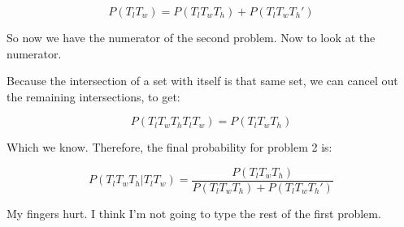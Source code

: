 \documentclass{article}
\begin{document}
\[
P(T_lT_w)=P(T_lT_wT_h)+P(T_lT_wT_h')
\]

So now we have the numerator of the second problem. Now to look at the
numerator.

Because the intersection of a set with itself is that same set, we can
cancel out the remaining intersections, to get:

\[
P(T_lT_wT_hT_lT_w)=P(T_lT_wT_h)
\]

Which we know. Therefore, the final probability for problem 2 is:

\[
P(T_lT_wT_h|T_lT_w)=\dfrac{P(T_lT_wT_h)}{P(T_lT_wT_h)+P(T_lT_wT_h')}
\]

My fingers hurt. I think I'm not going to type the rest of the first
problem.
\end{document}
